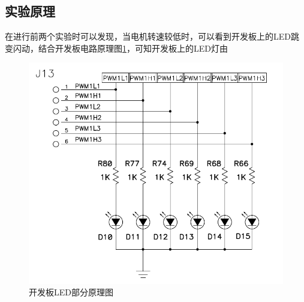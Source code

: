 \documentclass[a4paper,11pt]{ctexart}
\begin{document}
\begin{spacing}{1.5}
\subsection{实验原理}
\par
在进行前两个实验时可以发现，当电机转速较低时，可以看到开发板上的LED跳变闪动，结合开发板电路原理图\ref{figure:LED原理图}，可知开发板上的LED灯由
\begin{figure}[h]
	\centering
	\includegraphics[scale= 0.3]{LED.png}
	\caption{开发板LED部分原理图}\label{figure:LED原理图}
\end{figure}


\end{spacing}


	
\end{document}
